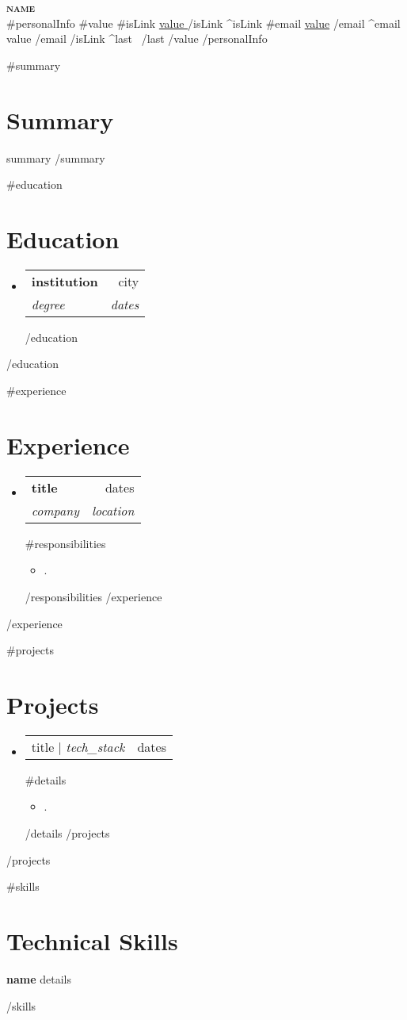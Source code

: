 \documentclass[letterpaper,11pt]{article}
\newcommand{\resumeItem}[1]{
  \item\small{
    {#1 \vspace{-2pt}}
  }
}
\newcommand{\resumeSubheading}[4]{
  \vspace{-2pt}\item
    \begin{tabularx}{\textwidth}{Xr}
      \textbf{#1} & #2 \\
      \textit{\small#3} & \textit{\small #4} \\
    \end{tabularx}\vspace{-7pt}
}
\newcommand{\resumeProjectHeading}[2]{
    \item
    \begin{tabularx}{\textwidth}{Xr}
      \small #1 & #2 \\
    \end{tabularx}\vspace{-7pt}
}
\newcommand{\resumeSubHeadingListStart}{\begin{itemize}[leftmargin=0.15in, label={}]}
\newcommand{\resumeSubHeadingListEnd}{\end{itemize}}
\newcommand{\resumeItemListStart}{\begin{itemize}}
\newcommand{\resumeItemListEnd}{\end{itemize}\vspace{-12pt}}
\begin{document}
\begin{center}
    \textbf{\Huge \scshape {{name}}} \\ \vspace{1pt}
    \small
    {{#personalInfo}}
      {{#value}}
        {{#isLink}}
          \href{ {{{link}}} }{ \underline{ {{value}} } }
        {{/isLink}}
        {{^isLink}}
          {{#email}}
            \underline{{{value}}}
          {{/email}}
          {{^email}}
            {{value}}
          {{/email}}
        {{/isLink}}
        {{^last}} \textbar\ {{/last}}
      {{/value}}
    {{/personalInfo}}
\end{center}
{{#summary}}
\section{Summary}
{{summary}}
{{/summary}}

{{#education}}
\section{Education}
  \resumeSubHeadingListStart
  {{#education}}
    \resumeSubheading
      { {{institution}} }{ {{city}} }
      { {{degree}} }{ {{dates}} }
  {{/education}}
  \resumeSubHeadingListEnd
{{/education}}

{{#experience}}
\section{Experience}
  \resumeSubHeadingListStart
  {{#experience}}
    \resumeSubheading
      { {{title}} }{ {{dates}} }
      { {{company}} }{ {{location}} }
      {{#responsibilities}}
      \resumeItemListStart
        \resumeItem{ {{.}} }
      \resumeItemListEnd
      {{/responsibilities}}
  {{/experience}}
  \resumeSubHeadingListEnd
{{/experience}}

{{#projects}}
\section{Projects}
  \resumeSubHeadingListStart
  {{#projects}}
    \resumeProjectHeading
      { {{title}} $|$ \emph{ {{tech_stack}} } }{ {{dates}} }
      {{#details}}
      \resumeItemListStart
        \resumeItem{ {{.}} }
      \resumeItemListEnd
      {{/details}}
  {{/projects}}
  \resumeSubHeadingListEnd
{{/projects}}

{{#skills}}
\section{Technical Skills}
 \begin{itemize}[leftmargin=0.15in, label={}]
    \small{\item{
      \textbf{ {{name}} }{ {{details}} } \\
    }}
 \end{itemize}
{{/skills}}

\end{document}

